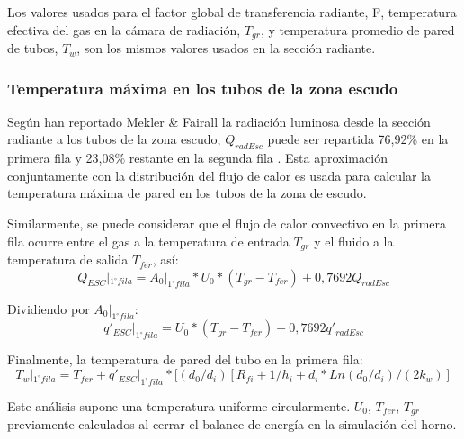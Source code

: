 \par Los valores usados para el factor global de transferencia radiante, F, temperatura efectiva del gas en la cámara de radiación, $T_{gr}$, y temperatura promedio de pared de tubos, $T_w$, son los mismos valores usados en la sección radiante.

\subsubsection{Temperatura máxima en los tubos de la zona escudo}
\par Según han reportado Mekler \& Fairall la radiación luminosa desde la sección radiante a los tubos de la zona escudo, $Q_{radEsc}$ puede ser repartida 76,92\% en la primera fila y 23,08\% restante en la segunda fila \cite{bib:mekler}. Esta aproximación conjuntamente con la distribución del flujo de calor es usada para calcular la temperatura máxima de pared en los tubos de la zona de escudo.
\par Similarmente, se puede considerar que el flujo de calor convectivo en la primera fila ocurre entre el gas a la temperatura de entrada $T_{gr}$ y el fluido a la temperatura de salida $T_{fer}$, así:
\begin{equation}
Q_{ESC}|_{1^{\circ} fila} = A_0|_{1^{\circ} fila}*U_0*(T_{gr} - T_{fer}) + 0,7692 Q_{radEsc}
\end{equation}
\par Dividiendo por $A_0|_{1^{\circ} fila}$:
\begin{equation}
q\prime_{ESC}|_{1^{\circ} fila} = U_0*(T_{gr} - T_{fer}) + 0,7692 q\prime_{radEsc}
\end{equation}
\par Finalmente, la temperatura de pared del tubo en la primera fila:
\begin{equation}
T_w|_{1^{\circ} fila} = T_{fer} + q\prime_{ESC}|_{1^{\circ} fila} *[(d_0/d_i ) [R_{fi} + 1/h_i + d_i*Ln(d_0/d_i)/(2k_w)]
\end{equation}
\par Este análisis supone una temperatura uniforme circularmente. $U_0$, $T_{fer}$, $T_{gr}$ previamente calculados al cerrar el balance de energía en la simulación del horno.


